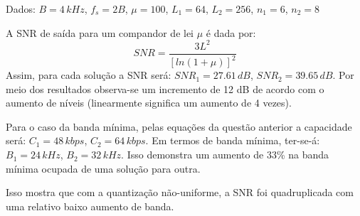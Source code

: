 Dados: $B=4 \, kHz$, $f_s=2B$, $\mu = 100$, $L_1 = 64$, $L_2 = 256$, $n_1 = 6$, $n_2 = 8$

A SNR de saída para um compandor de lei $\mu$ é dada por:
\begin{equation}
	SNR = \frac{3L^2}{[ln(1+\mu)]^2} 
\end{equation}
Assim, para cada solução a SNR será: $SNR_1 = 27.61 \, dB$, $SNR_2= 39.65 \, dB$. Por meio dos resultados observa-se um incremento de 12 dB de acordo com o aumento de níveis (linearmente significa um aumento de 4 vezes).

Para o caso da banda mínima, pelas equações da questão anterior a capacidade será: $C_1 = 48\, kbps$, $C_2 = 64\, kbps$. Em termos de banda mínima, ter-se-á:  $B_1 = 24\, kHz$, $B_2 = 32\, kHz$. Isso demonstra um aumento de 33\% na banda mínima ocupada de uma solução para outra. 

Isso mostra que com a quantização não-uniforme, a SNR foi quadruplicada com uma relativo baixo aumento de banda.
